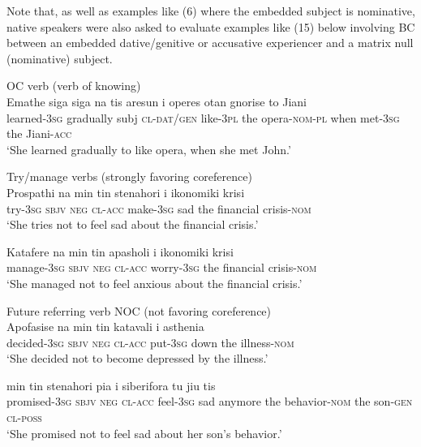 \documentclass[output=paper]{langsci/langscibook}
\begin{document}
Note that, as well as examples like (6) where the embedded subject is nominative, native speakers were also asked to evaluate examples like (15) below involving BC between an embedded dative/genitive or accusative experiencer and a matrix null (nominative) subject. 

\ea%
    \label{ex:alexiadou:15}
OC verb (verb of knowing)\\
\ea \gll Emathe siga {siga na}   tis aresun i operes otan   gnorise   to Jiani\\
learned-\textsc{3sg} gradually subj \textsc{cl-dat/gen} like-\textsc{3pl} the opera-\textsc{nom-pl} when met-\textsc{3sg} the Jiani-\textsc{acc}\\
\glt ‘She learned gradually to like opera, when she met John.’

Try/manage verbs (strongly favoring coreference)\\

\ex \gll  Prospathi   na   min   tin   stenahori   i ikonomiki krisi \\
    try-\textsc{3sg sbjv}  \textsc{neg}  \textsc{cl-acc} make-\textsc{3sg} sad  the financial crisis-\textsc{nom}\\
    \glt ‘She tries not to feel sad about the financial crisis.’

\ex\gll  Katafere   na   min   tin   apasholi    i ikonomiki krisi\\
    manage-\textsc{3sg} \textsc{sbjv}  \textsc{neg}  \textsc{cl-acc} worry-\textsc{3sg} the financial crisis-\textsc{nom}\\
    \glt ‘She managed not to feel anxious about the financial crisis.’

Future referring verb NOC (not favoring coreference)  \\

\ex \gll Apofasise   na   min   tin   katavali   i asthenia\\
         decided-\textsc{3sg} \textsc{sbjv}  \textsc{neg} \textsc{cl-acc}   put-\textsc{3sg} down the illness-\textsc{nom}\\
    \glt ‘She decided not to become depressed by the illness.’

\ex {} min   tin   stenahori   pia i   siberifora    tu   jiu    tis \\
         promised-\textsc{3sg} \textsc{sbjv}  \textsc{neg}   \textsc{cl-acc}  {feel-\textsc{3sg} sad anymore} the   behavior-\textsc{nom}  the    son-\textsc{gen}   \textsc{cl-poss}\\
    \glt ‘She promised not to feel sad about her son’s behavior.’
\z
\z
\end{document}
